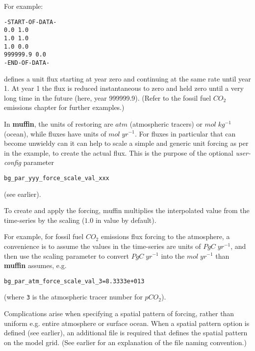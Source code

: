 \vspace{1mm}

For example:
\vspace{-2mm}\footnotesize\begin{verbatim}
-START-OF-DATA-
0.0 1.0
1.0 1.0
1.0 0.0
999999.9 0.0
-END-OF-DATA-
\end{verbatim}\normalsize\vspace{-2mm}
defines a unit flux starting at year zero and continuing at the same rate until year 1. At year 1 the flux is reduced instantaneous to zero and held zero until a very long time in the future (here, year 999999.9). (Refer to the fossil fuel \(CO_{2}\) emissions chapter for further examples.)

\vspace{1mm}

In \textbf{muffin}, the units of restoring are \(atm\) (atmospheric tracers) or \(mol\;kg^{-1}\) (ocean), while fluxes have units of \(mol\;yr^{-1}\). For fluxes in particular that can become unwieldy can it can help to scale a simple and generic unit forcing as per in the example, to create the actual flux. This is the purpose of the optional \textit{user-config} parameter \vspace{-2mm}\small\begin{verbatim}
bg_par_yyy_force_scale_val_xxx
\end{verbatim}\normalsize\vspace{-2mm}
(see earlier). 

To create and apply the forcing, muffin multiplies the interpolated value from the time-series by the scaling (\(1.0\) in value by default).

For example, for fossil fuel \(CO_{2}\) emissions flux forcing to the atmosphere, a convenience is to assume the values in the time-series are units of \(PgC\;yr^{-1}\), and then use the scaling parameter to convert \(PgC\;yr^{-1}\) into the \(mol\;yr^{-1}\) than \textbf{muffin} assumes, e.g.
\vspace{-2mm}\small\begin{verbatim}
bg_par_atm_force_scale_val_3=8.3333e+013
\end{verbatim}\normalsize\vspace{-2mm}
(where \texttt{3} is the atmospheric tracer number for \(pCO_{2}\)).

\newpage

\noindent Complications arise when specifying a spatial pattern of forcing, rather than uniform e.g. entire atmosphere or surface ocean. When a spatial pattern option is defined (see earlier), an additional file is required that defines the spatial pattern on the model grid. (See earlier for an explanation of the file naming convention.)

